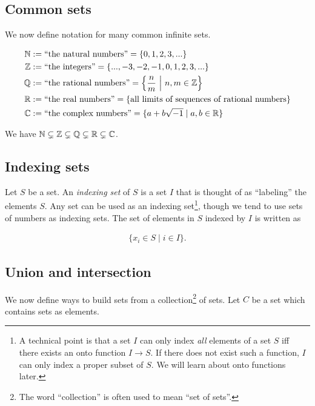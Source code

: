 \subsection*{Common sets}

We now define notation for many common infinite sets.

\begin{align*}
    \mathbb{N} &:= \text{``the natural numbers''} = \{0, 1, 2, 3, ...\} \\
    \mathbb{Z} &:= \text{``the integers''} = \{..., -3, -2, -1, 0, 1, 2, 3, ... \} \\
    \mathbb{Q} &:= \text{``the rational numbers''} = \Big\{ \frac{n}{m} \text{ } \Big| \text{ } n, m \in \mathbb{Z} \Big\} \\
    \mathbb{R} &:= \text{``the real numbers''} = \{ \text{all limits of sequences of rational numbers} \} \\
    \mathbb{C} &:= \text{``the complex numbers''} = \{ a + b \sqrt{-1} \mid a, b \in \mathbb{R} \}
\end{align*}

We have $\mathbb{N} \subsetneq \mathbb{Z} \subsetneq \mathbb{Q} \subsetneq \mathbb{R} \subsetneq \mathbb{C}$.

\subsection*{Indexing sets}

Let $S$ be a set. An \textit{indexing set} of $S$ is a set $I$ that is thought of as ``labeling'' the elements $S$. Any set can be used as an indexing set\footnote{A technical point is that a set $I$ can only index \textit{all} elements of a set $S$ iff there exists an onto function $I \rightarrow S$. If there does not exist such a function, $I$ can only index a proper subset of $S$. We will learn about onto functions later.}, though we tend to use sets of numbers as indexing sets. The set of elements in $S$ indexed by $I$ is written as

\begin{align*}
    \{ x_i \in S \mid i \in I \}.
\end{align*}

\newpage

\subsection*{Union and intersection}

We now define ways to build sets from a collection\footnote{The word ``collection'' is often used to mean ``set of sets''.} of sets. Let $C$ be a set which contains sets as elements.

